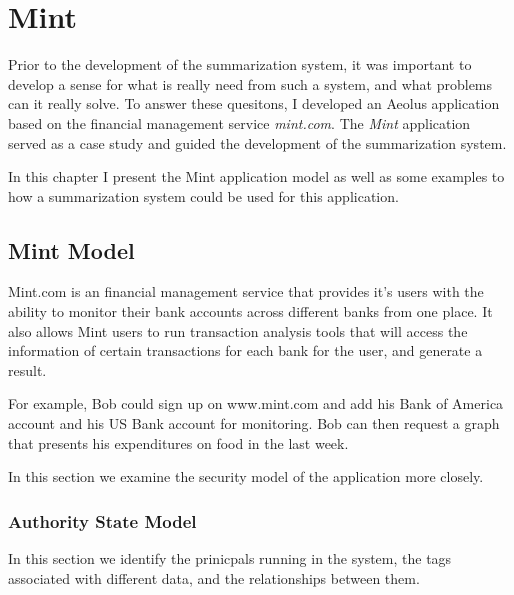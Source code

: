 \chapter{Mint}

Prior to the development of the summarization system, it was important to develop a sense for what is really need from such a system, and what problems can it really solve. To answer these quesitons, I developed an Aeolus application based on the financial management service \emph{mint.com}. The \emph{Mint} application served as a case study and guided the development of the summarization system.

In this chapter I present the Mint application model as well as some examples to how a summarization system could be used for this application.

\section{Mint Model}

Mint.com is an financial management service that provides it's users with the ability to monitor their bank accounts across different banks from one place. It also allows Mint users to run transaction analysis tools that will access the information of certain transactions for each bank for the user, and generate a result.

For example, Bob could sign up on www.mint.com and add his Bank of America account and his US Bank account for monitoring. Bob can then request a graph that presents his expenditures on food in the last week.

In this section we examine the security model of the application more closely.

\subsection{Authority State Model}

In this section we identify the prinicpals running in the system, the tags associated with different data, and the relationships between them.


